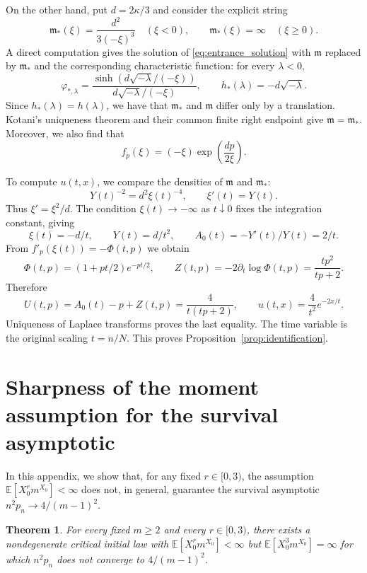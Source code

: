 \documentclass[11pt,letterpaper,reqno]{amsart}
\numberwithin{equation}{section}
\theoremstyle{plain}
\newtheorem{theorem}{Theorem}[section]
\theoremstyle{remark}
\newcommand{\E}{\mathbb E}\newcommand{\Pp}{\mathbb P}
\begin{document}
On the other hand, put $d=2\kappa/3$ and consider the explicit string
\begin{equation*}
 \mathfrak m_*(\xi)=\frac{d^2}{3(-\xi)^3}\quad(\xi<0),\qquad
 \mathfrak m_*(\xi)=\infty\quad(\xi\ge0).
\end{equation*}
A direct computation gives the solution of \eqref{eq:entrance_solution} with $\mathfrak m$ replaced by $\mathfrak m_*$ and the corresponding characteristic function: for every $\lambda<0$,
\begin{equation*}
    \varphi_{*, \lambda} = \frac{\sinh(d\sqrt{-\lambda}/(-\xi))}{d\sqrt{-\lambda}/(-\xi)}, \qquad h_*(\lambda) = -d\sqrt{-\lambda}.
\end{equation*}
Since $h_*(\lambda) = h(\lambda)$, we have that $\mathfrak{m}_*$ and $\mathfrak{m}$ differ only by a translation. Kotani's uniqueness theorem and their common finite right endpoint give $\mathfrak m=\mathfrak m_*$. Moreover, we also find that
\begin{equation*}
    f_p(\xi) = (-\xi) \exp \left( \frac{dp}{2\xi} \right).
\end{equation*}

To compute $u(t,x)$, we compare the densities of $\mathfrak m$ and $\mathfrak m_*$:
\[
 Y(t)^{-2}=d^2\xi(t)^{-4},\qquad \xi'(t)=Y(t).
\]
Thus $\xi'=\xi^2/d$. The condition $\xi(t)\to-\infty$ as $t\downarrow0$ fixes the integration constant, giving
\[
 \xi(t)=-d/t,\qquad Y(t)=d/t^2,\qquad A_0(t)=-Y'(t)/Y(t)=2/t.
\]
From $f'_p(\xi(t))=-\Phi(t,p)$ we obtain
\[
 \Phi(t,p)=(1+pt/2)e^{-pt/2},\qquad
 Z(t,p)=-2\partial_t\log\Phi(t,p)=\frac{tp^2}{tp+2}.
\]
Therefore
\begin{equation*}
 U(t,p)=A_0(t)-p+Z(t,p)=\frac4{t(tp+2)},\qquad
 u(t,x)=\frac4{t^2}e^{-2x/t}.
\end{equation*}
Uniqueness of Laplace transforms proves the last equality. The time variable is the original scaling $t=n/N$. This proves Proposition~\ref{prop:identification}.

\appendix
\section{Sharpness of the moment assumption for the survival asymptotic}\label{sec:sharpness}
In this appendix, we show that, for any fixed $r\in[0,3)$, the assumption $\E[X_0^rm^{X_0}]<\infty$ does not, in general, guarantee the survival asymptotic $n^2p_n\to4/(m-1)^2$.

\begin{theorem}\label{thm:sharpness}
For every fixed $m\ge2$ and every $r\in[0,3)$, there exists a nondegenerate critical initial law with $\E[X_0^rm^{X_0}]<\infty$ but $\E[X_0^3m^{X_0}]=\infty$ for which $n^2p_n$ does not converge to $4/(m-1)^2$.
\end{theorem}
\end{document}

